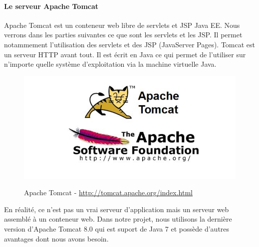 \paragraph{Le serveur Apache Tomcat}
Apache Tomcat est un conteneur web libre de servlets et JSP Java EE. Nous verrons dans les parties suivantes ce que sont les servlets et les JSP. Il permet notammement l'utilisation des servlets et des JSP (JavaServer Pages).
Tomcat est un serveur HTTP avant tout. Il est écrit en Java ce qui permet de l'utiliser sur n'importe quelle système d'exploitation via la machine virtuelle Java.
\begin{figure}[H]
  \center
  \includegraphics[scale=0.25]{../graph/apache.png} \\
  \caption{Apache Tomcat - \url{http://tomcat.apache.org/index.html}}
\end{figure}
En réalité, ce n'est pas un vrai serveur d'application mais un serveur web assemblé à un conteneur web. Dans notre projet, nous utilisons la dernière version d'Apache Tomcat 8.0 qui est suport de Java 7 et possède d'autres avantages dont nous avons besoin.

